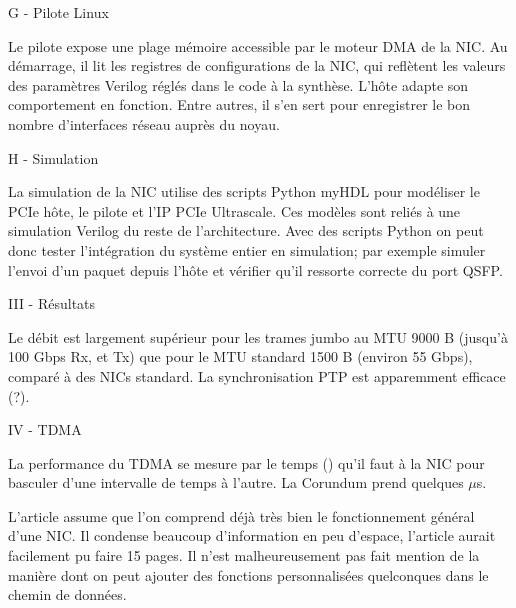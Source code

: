 G - Pilote Linux

Le pilote expose une plage mémoire accessible par le moteur DMA de la NIC. Au démarrage, il lit les registres de configurations de la NIC, qui reflètent les valeurs des paramètres Verilog réglés dans le code à la synthèse. L'hôte adapte son comportement en fonction. Entre autres, il s'en sert pour enregistrer le bon nombre d'interfaces réseau auprès du noyau.

H - Simulation

La simulation de la NIC utilise des scripts Python myHDL pour modéliser le PCIe hôte, le pilote et l'IP PCIe Ultrascale. Ces modèles sont reliés à une simulation Verilog du reste de l'architecture. Avec des scripts Python on peut donc tester l'intégration du système entier en simulation; par exemple simuler l'envoi d'un paquet depuis l'hôte et vérifier qu'il ressorte correcte du port QSFP.

III - Résultats

Le débit est largement supérieur pour les trames \og jumbo \fg au MTU 9000 B (jusqu'à 100 Gbps Rx, et Tx) que pour le MTU standard 1500 B (environ 55 Gbps), comparé à des NICs standard. La synchronisation PTP est apparemment efficace (?).

IV - TDMA

La performance du TDMA se mesure par le temps () qu'il faut à la NIC pour basculer d'une intervalle de temps à l'autre. La Corundum prend quelques $\mu$s.

 L'article assume que l'on comprend déjà très bien le fonctionnement général d'une NIC. Il condense beaucoup d'information en peu d'espace, l'article aurait facilement pu faire 15 pages. Il n'est malheureusement pas fait mention de la manière dont on peut ajouter des fonctions personnalisées quelconques dans le chemin de données.

\clearpage
